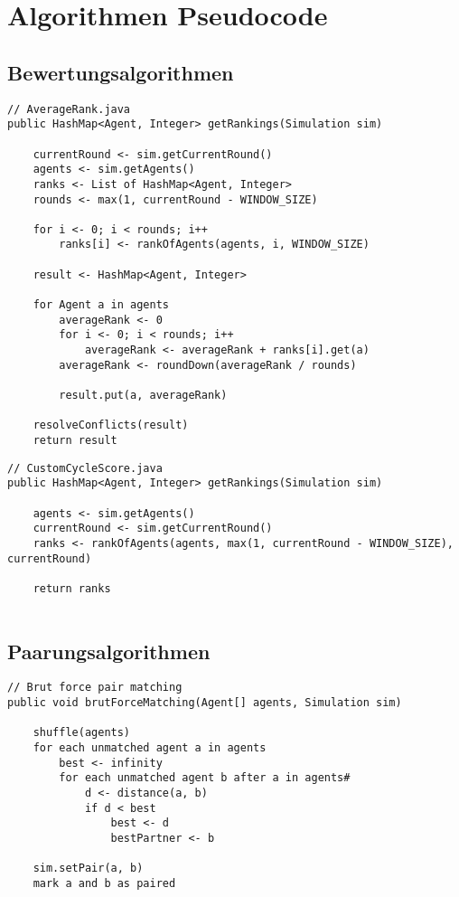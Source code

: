 \chapter{Algorithmen Pseudocode}

\section{Bewertungsalgorithmen}

\begin{lstlisting}
// AverageRank.java
public HashMap<Agent, Integer> getRankings(Simulation sim) 
	
	currentRound <- sim.getCurrentRound()
	agents <- sim.getAgents()
	ranks <- List of HashMap<Agent, Integer>	
	rounds <- max(1, currentRound - WINDOW_SIZE)
	
	for i <- 0; i < rounds; i++ 
		ranks[i] <- rankOfAgents(agents, i, WINDOW_SIZE)
	
	result <- HashMap<Agent, Integer>	
	
	for Agent a in agents
		averageRank <- 0
		for i <- 0; i < rounds; i++
			averageRank <- averageRank + ranks[i].get(a)
		averageRank <- roundDown(averageRank / rounds)
		
		result.put(a, averageRank)
	
	resolveConflicts(result)
	return result
\end{lstlisting}


\begin{lstlisting}
// CustomCycleScore.java
public HashMap<Agent, Integer> getRankings(Simulation sim) 
	
	agents <- sim.getAgents()
	currentRound <- sim.getCurrentRound()
	ranks <- rankOfAgents(agents, max(1, currentRound - WINDOW_SIZE), currentRound)
	
	return ranks
	
\end{lstlisting}

\section{Paarungsalgorithmen}

\begin{lstlisting}
// Brut force pair matching
public void brutForceMatching(Agent[] agents, Simulation sim) 

	shuffle(agents)
	for each unmatched agent a in agents
		best <- infinity
		for each unmatched agent b after a in agents#
			d <- distance(a, b)
			if d < best
				best <- d
				bestPartner <- b
				
	sim.setPair(a, b)
	mark a and b as paired		
	
\end{lstlisting}


